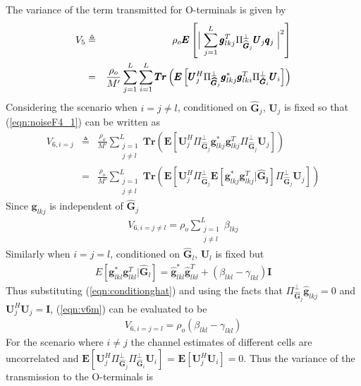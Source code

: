 \documentclass[10pt, a4paper, twoside,fleqn]{article}
\begin{document}
The variance of the term transmitted for O-terminals is given by
\begin{eqnarray}\label{eqn:noiseF4_1}
	V_5 &\triangleq& \rho_o\pmb{E}\left[\Bigm|\sum_{j=1}^{L}\pmb{g}_{lkj}^T\Pi^{\perp}_{{\widehat{\pmb{G}}_j}}\pmb{U}_j \pmb{q}_{j}\Bigm|^2\right] \nonumber \\
            &=&       \frac{\rho_o}{M'}\sum_{j=1}^{L}\sum_{i=1}^{L} \pmb{Tr}\left(\pmb{E}\left[\pmb{U}_j^H \Pi^{\perp}_{\pmb{\widehat{G}}_j} \pmb{g}_{lkj}^* \pmb{g}_{lki}^{T}\Pi^{\perp}_{\pmb{\hat G}_i} \pmb{U}_i \right]\right)
\end{eqnarray}
Considering the scenario when $i=j\neq l$, conditioned on $\pmb{\hat G}_j$, $\pmb{U}_j$ is fixed so that
(\ref{eqn:noiseF4_1}) can be written as 
\begin{eqnarray}\label{eqn:v6m}
V_{6,i=j}&\triangleq& \frac{\rho_o}{M'}\sum\limits_{\substack{j=1 \\ j \neq l}}^{L} \pmb{Tr}\left(\pmb{E}\left[\pmb{U}_j^H \Pi^{\perp}_{\pmb{\widehat{G}}_j} \pmb{g}_{lkj}^* \pmb{g}_{lkj}^{T}\Pi^{\perp}_{\pmb{\hat G}_j} \pmb{U}_j \right]\right) \nonumber \\
           &=& \frac{\rho_o}{M'}\sum_{\substack{j=1 \\ j \neq l}}^{L}\pmb{Tr}\left(\pmb{E}\left[\pmb{U}_j^H \Pi^{\perp}_{\pmb{\widehat{G}}_j} \pmb{E}[\pmb{g}_{lkj}^* \pmb{g}_{lkj}^{T} | \pmb{\hat G_j}]\Pi^{\perp}_{\pmb{\hat G}_j} \pmb{U}_j \right]\right)
\end{eqnarray}
Since $\pmb{g}_{lkj}$ is independent of $\pmb{\hat G}_j$
\begin{eqnarray}\label{eqn:v6neql}
V_{6,i=j\neq l} = \rho_o\sum\limits_{\substack{j=1 \\ j \neq l}}^{L}\beta_{lkj}
\end{eqnarray}
Similarly when $i=j=l$, conditioned on $\pmb{\hat G}_l$, $\pmb{U}_l$ is fixed but
\begin{eqnarray}\label{eqn:conditionghat}
E[\pmb{g}_{lkl}^*\pmb{g}_{lkl}^T|\pmb{\hat G}_l] = \pmb{\hat g}_{lkl}^*\pmb{\hat g}_{lkl}^T + (\beta_{lkl}-\gamma_{lkl})\pmb{I}
\end{eqnarray}
Thus substituting (\ref{eqn:conditionghat}) and using the facts that $\Pi^{\perp}_{\pmb{\hat G}_j}\pmb{\hat g}_{lkj} = 0$ and $\pmb{U}_j^H\pmb{U}_j=\pmb{I}$, (\ref{eqn:v6m}) can be evaluated to be
\begin{eqnarray}\label{eqn:v6l}
V_{6,i=j=l}= \rho_o(\beta_{lkl} -\gamma_{lkl})
\end{eqnarray}
For the scenario where $i\neq j$ the channel estimates of different cells are uncorrelated and $\pmb{E}\left[\pmb{U}_j^H\Pi^{\perp}_{\pmb{\widehat{G}}_j}\Pi^{\perp}_{\pmb{\widehat{G}}_i} \pmb{U}_i\right]$ = $\pmb{E}[\pmb{U}_j^H\pmb{U}_i] =0$. Thus the variance of the transmission to the O-terminals is
\end{document}

